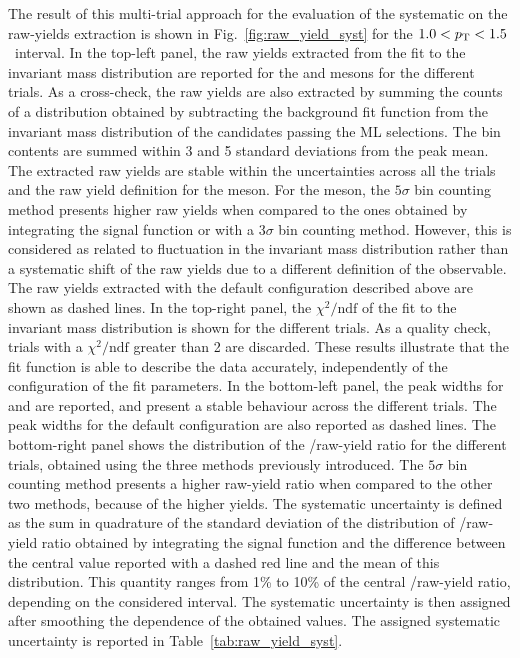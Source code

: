 The result of this multi-trial approach for the evaluation of the systematic on the raw-yields extraction is shown in Fig.~\ref{fig:raw_yield_syst} for the $1.0<p_\mathrm{T}<1.5$~\gevc interval. In the top-left panel, the raw yields extracted from the fit to the invariant mass distribution are reported for the \ds and \dpl mesons for the different trials. As a cross-check, the raw yields are also extracted by summing the counts of a distribution obtained by subtracting the background fit function from the invariant mass distribution of the candidates passing the ML selections. The bin contents are summed within 3 and 5 standard deviations from the peak mean. The extracted raw yields are stable within the uncertainties across all the trials and the raw yield definition for the \dpl meson. For the \ds meson, the $5\sigma$ bin counting method presents higher raw yields when compared to the ones obtained by integrating the signal function or with a $3\sigma$ bin counting method. However, this is considered as related to fluctuation in the invariant mass distribution rather than a systematic shift of the raw yields due to a different definition of the observable. The raw yields extracted with the default configuration described above are shown as dashed lines. In the top-right panel, the $\chi^2/\mathrm{ndf}$ of the fit to the invariant mass distribution is shown for the different trials. As a quality check, trials with a $\chi^2/\mathrm{ndf}$ greater than 2 are discarded. These results illustrate that the fit function is able to describe the data accurately, independently of the configuration of the fit parameters. In the bottom-left panel, the peak widths for \ds and \dpl are reported, and present a stable behaviour across the different trials. The peak widths for the default configuration are also reported as dashed lines. The bottom-right panel shows the distribution of the \ds/\dpl raw-yield ratio for the different trials, obtained using the three methods previously introduced. The $5\sigma$ bin counting method presents a higher raw-yield ratio when compared to the other two methods, because of the higher \ds yields. The systematic uncertainty is defined as the sum in quadrature of the standard deviation of the distribution of \ds/\dpl raw-yield ratio obtained by integrating the signal function and the difference between the central value reported with a dashed red line and the mean of this distribution. This quantity ranges from 1\% to 10\% of the central \ds/\dpl raw-yield ratio, depending on the considered \pt interval. The systematic uncertainty is then assigned after smoothing the \pt dependence of the obtained values. The assigned systematic uncertainty is reported in Table~\ref{tab:raw_yield_syst}.





